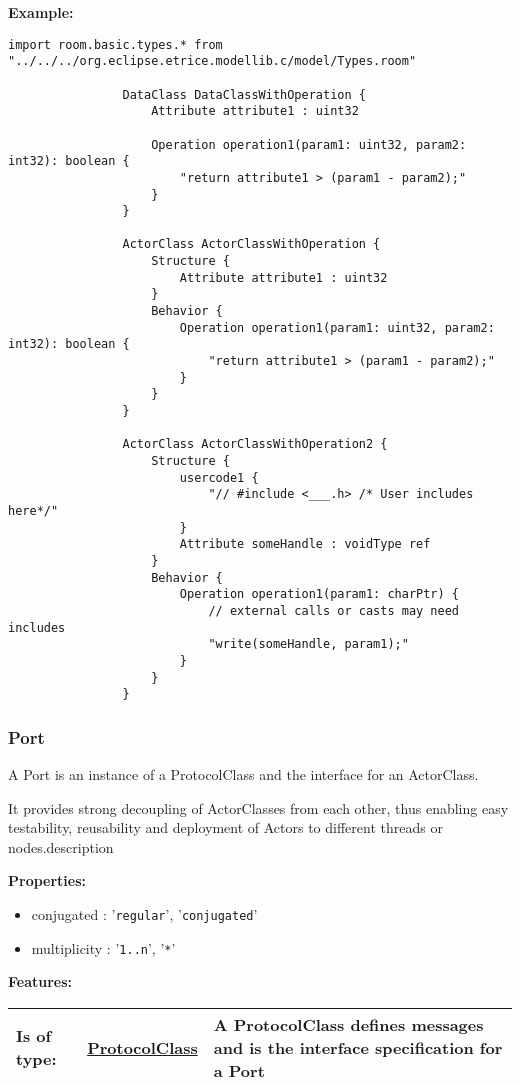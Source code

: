 		\textbf{Example:}
		
				\begin{lstlisting}[language=ROOM]
				import room.basic.types.* from "../../../org.eclipse.etrice.modellib.c/model/Types.room"
			
				DataClass DataClassWithOperation {
					Attribute attribute1 : uint32
					
					Operation operation1(param1: uint32, param2: int32): boolean {
						"return attribute1 > (param1 - param2);"
					}
				}
				
				ActorClass ActorClassWithOperation {
					Structure {
						Attribute attribute1 : uint32
					}
					Behavior {
						Operation operation1(param1: uint32, param2: int32): boolean {
							"return attribute1 > (param1 - param2);"
						}
					}
				}
				
				ActorClass ActorClassWithOperation2 {
					Structure {
						usercode1 {
							"// #include <___.h> /* User includes here*/"
						}
						Attribute someHandle : voidType ref
					}
					Behavior {
						Operation operation1(param1: charPtr) {
							// external calls or casts may need includes
							"write(someHandle, param1);"
						}
					}
				}
				\end{lstlisting}
	
	\vspace{\baselineskip}
	\vspace{\baselineskip}
	\vspace{\baselineskip}
	
	\subsubsection{Port}
		\hypertarget{ref:Port}{}
		
		A Port is an instance of a ProtocolClass and the interface for an ActorClass.
		
		It provides strong decoupling of ActorClasses from each other, thus enabling easy testability, reusability and deployment of Actors to different threads or nodes.description
		
		\textbf{Properties:}
		\begin{itemize}
		\item conjugated : '\verb|regular|', '\verb|conjugated|'
		\item multiplicity : '\verb|1..n|', '\verb|*|'
		\end{itemize}
		
		\begingroup
		\textbf{Features:}
		\renewcommand{\arraystretch}{1.8} %
		\begin{longtable}{l|l p{}}
			\hline
		Is of type: & \tabitem \hyperlink{ref:ProtocolClass}{ProtocolClass}  & A ProtocolClass defines messages and is the interface specification for a Port\\
		\hline
		\end{longtable}
		\endgroup
		
